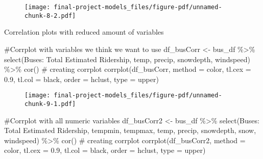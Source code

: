 \documentclass[
  letterpaper,
  DIV=11,
  numbers=noendperiod]{scrartcl}
\newenvironment{Shaded}{\begin{snugshade}}{\end{snugshade}}
\newcommand{\AttributeTok}[1]{\textcolor[rgb]{0.40,0.45,0.13}{#1}}
\newcommand{\CommentTok}[1]{\textcolor[rgb]{0.37,0.37,0.37}{#1}}
\newcommand{\FloatTok}[1]{\textcolor[rgb]{0.68,0.00,0.00}{#1}}
\newcommand{\FunctionTok}[1]{\textcolor[rgb]{0.28,0.35,0.67}{#1}}
\newcommand{\NormalTok}[1]{\textcolor[rgb]{0.00,0.23,0.31}{#1}}
\newcommand{\OtherTok}[1]{\textcolor[rgb]{0.00,0.23,0.31}{#1}}
\newcommand{\SpecialCharTok}[1]{\textcolor[rgb]{0.37,0.37,0.37}{#1}}
\newcommand{\StringTok}[1]{\textcolor[rgb]{0.13,0.47,0.30}{#1}}
\begin{document}
\begin{figure}[H]

{\centering \texttt{[image: final-project-models\_files/figure-pdf/unnamed-chunk-8-2.pdf]}

}

\end{figure}

Correlation plots with reduced amount of variables

\begin{Shaded}
\begin{Highlighting}[]
\CommentTok{\#Corrplot with variables we think we want to use}
\NormalTok{df\_busCorr }\OtherTok{\textless{}{-}}\NormalTok{ bus\_df }\SpecialCharTok{\%\textgreater{}\%}
  \FunctionTok{select}\NormalTok{(}\StringTok{\textasciigrave{}}\AttributeTok{Buses: Total Estimated Ridership}\StringTok{\textasciigrave{}}\NormalTok{, temp, precip, snowdepth, windspeed) }\SpecialCharTok{\%\textgreater{}\%}
  \FunctionTok{cor}\NormalTok{()}
\CommentTok{\# creating corrplot}
\FunctionTok{corrplot}\NormalTok{(df\_busCorr, }\AttributeTok{method =} \StringTok{\textquotesingle{}color\textquotesingle{}}\NormalTok{, }\AttributeTok{tl.cex =} \FloatTok{0.9}\NormalTok{, }\AttributeTok{tl.col =} \StringTok{\textquotesingle{}black\textquotesingle{}}\NormalTok{,}
\AttributeTok{order =} \StringTok{\textquotesingle{}hclust\textquotesingle{}}\NormalTok{, }\AttributeTok{type =} \StringTok{\textquotesingle{}upper\textquotesingle{}}\NormalTok{)}
\end{Highlighting}
\end{Shaded}

\begin{figure}[H]

{\centering \texttt{[image: final-project-models\_files/figure-pdf/unnamed-chunk-9-1.pdf]}

}

\end{figure}

\begin{Shaded}
\begin{Highlighting}[]
\CommentTok{\#Corrplot with all numeric variables}
\NormalTok{df\_busCorr2 }\OtherTok{\textless{}{-}}\NormalTok{ bus\_df }\SpecialCharTok{\%\textgreater{}\%}
  \FunctionTok{select}\NormalTok{(}\StringTok{\textasciigrave{}}\AttributeTok{Buses: Total Estimated Ridership}\StringTok{\textasciigrave{}}\NormalTok{, tempmin, tempmax, temp, precip, snowdepth, snow, windspeed) }\SpecialCharTok{\%\textgreater{}\%}
  \FunctionTok{cor}\NormalTok{()}
\CommentTok{\# creating corrplot}
\FunctionTok{corrplot}\NormalTok{(df\_busCorr2, }\AttributeTok{method =} \StringTok{\textquotesingle{}color\textquotesingle{}}\NormalTok{, }\AttributeTok{tl.cex =} \FloatTok{0.9}\NormalTok{, }\AttributeTok{tl.col =} \StringTok{\textquotesingle{}black\textquotesingle{}}\NormalTok{,}
\AttributeTok{order =} \StringTok{\textquotesingle{}hclust\textquotesingle{}}\NormalTok{, }\AttributeTok{type =} \StringTok{\textquotesingle{}upper\textquotesingle{}}\NormalTok{)}
\end{Highlighting}
\end{Shaded}
\end{document}
